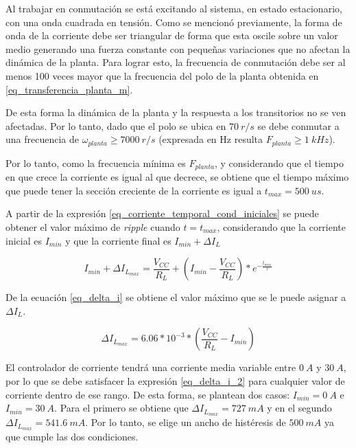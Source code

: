 Al trabajar en conmutación se está excitando al sistema, en estado estacionario, con una onda cuadrada en tensión. Como se mencionó previamente, la forma de onda de la corriente debe ser triangular de forma que esta oscile sobre un valor medio generando una fuerza constante con pequeñas variaciones que no afectan la dinámica de la planta. Para lograr esto, la frecuencia de conmutación debe ser al menos 100 veces mayor que la frecuencia del polo de la planta obtenida en \ref{eq_transferencia_planta_m}. 

De esta forma la dinámica de la planta y la respuesta a los transitorios no se ven afectadas.  Por lo tanto, dado que el polo se ubica en $70\:r/s$  se debe conmutar a una frecuencia de $\omega_{planta}\geq7000\:r/s$ (expresada en Hz resulta $F_{planta}\geq1\:kHz$). 

Por lo tanto, como la frecuencia mínima es $F_{planta}$, y considerando que el tiempo en que crece la corriente es igual al que decrece, se obtiene que el tiempo máximo que puede tener la sección creciente de la corriente es igual a $t_{max}=500\:us$. 

A partir de la expresión \ref{eq_corriente_temporal_cond_iniciales} se puede obtener el valor máximo de \textsl{ripple} cuando $t=t_{max}$, considerando que la corriente inicial es $I_{min}$ y que la corriente final es $I_{min}+\Delta I_L$

\begin{equation} \label{eq_delta_i}
	I_{min}+\Delta I_{L_{max}}=\frac{V_{CC}}{R_L}+(I_{min}-\frac{V_{CC}}{R_L})*e^{-\frac{t_{max}}{\tau}}
\end{equation}

De la ecuación \ref{eq_delta_i} se obtiene el valor máximo que se le puede asignar a $\Delta I_L$. 

\begin{equation} \label{eq_delta_i_2}
	\Delta I_{L_{max}}=6.06*10^{-3}*(\frac{V_{CC}}{R_L}-I_{min})
\end{equation}

El controlador de corriente tendrá una corriente media variable entre $0\:A$ y $30\:A$, por lo que se debe satisfacer la expresión \ref{eq_delta_i_2} para cualquier valor de corriente dentro de ese rango. De esta forma, se plantean dos casos: $I_{min}=0\:A$ e $I_{min}=30\:A$. Para el primero se obtiene que $\Delta I_{L_{max}}=727\:mA$ y en el segundo $\Delta I_{L_{max}}=541.6\:mA$. Por lo tanto, se elige un ancho de histéresis de $500\:mA$ ya que cumple las dos condiciones.

